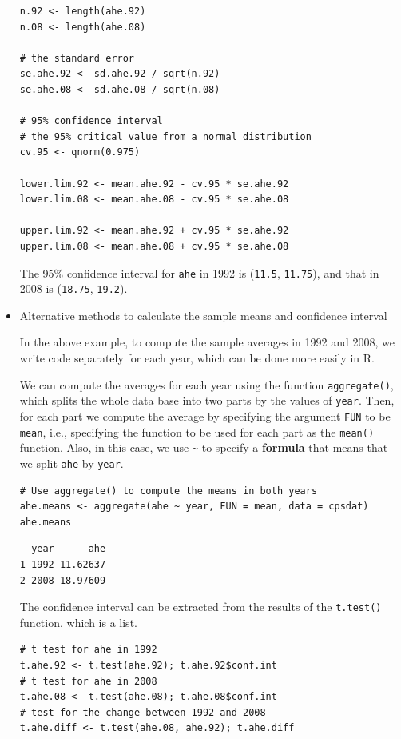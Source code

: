 \documentclass[a4paper,11pt]{article}
\begin{document}
\begin{itemize}
\begin{verbatim}
n.92 <- length(ahe.92)
n.08 <- length(ahe.08)

# the standard error
se.ahe.92 <- sd.ahe.92 / sqrt(n.92)
se.ahe.08 <- sd.ahe.08 / sqrt(n.08)

# 95% confidence interval
# the 95% critical value from a normal distribution
cv.95 <- qnorm(0.975)

lower.lim.92 <- mean.ahe.92 - cv.95 * se.ahe.92
lower.lim.08 <- mean.ahe.08 - cv.95 * se.ahe.08

upper.lim.92 <- mean.ahe.92 + cv.95 * se.ahe.92
upper.lim.08 <- mean.ahe.08 + cv.95 * se.ahe.08
\end{verbatim}

The 95\% confidence interval for \texttt{ahe} in 1992 is
(\texttt{11.5}, \texttt{11.75}), and
that in 2008 is (\texttt{18.75},
\texttt{19.2}).

\item Alternative methods to calculate the sample means and confidence interval
\label{sec:org65e7624}

In the above example, to compute the sample averages in 1992 and 2008,
we write code separately for each year, which can be done more easily
in R.

We can compute the averages for each year using the function
\texttt{aggregate()}, which splits the whole data base into two parts by the
values of \texttt{year}. Then, for each part we compute the average by
specifying the argument \texttt{FUN} to be \texttt{mean}, i.e., specifying the
function to be used for each part as the \texttt{mean()} function. Also, in
this case, we use \texttt{\textasciitilde{}} to specify a \textbf{formula} that means that we split
\texttt{ahe} by \texttt{year}.

\begin{verbatim}
# Use aggregate() to compute the means in both years
ahe.means <- aggregate(ahe ~ year, FUN = mean, data = cpsdat)
ahe.means
\end{verbatim}

\begin{verbatim}
  year      ahe
1 1992 11.62637
2 2008 18.97609
\end{verbatim}

The confidence interval can be extracted from the results of the
\texttt{t.test()} function, which is a list.
\begin{verbatim}
# t test for ahe in 1992
t.ahe.92 <- t.test(ahe.92); t.ahe.92$conf.int
# t test for ahe in 2008
t.ahe.08 <- t.test(ahe.08); t.ahe.08$conf.int
# test for the change between 1992 and 2008
t.ahe.diff <- t.test(ahe.08, ahe.92); t.ahe.diff
\end{verbatim}


\end{itemize}
\end{document}
